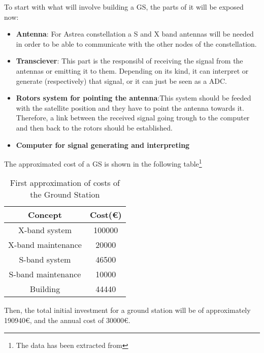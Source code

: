 To start with what will involve building a GS, the parts of it will be exposed now:

\begin{itemize}
\item \textbf{Antenna}: For Astrea constellation a S and X band antennas will be needed in order to be able to communicate with the other nodes of the constellation.
\item \textbf{Transciever}: This part is the responsibl of receiving the signal from the antennas or emitting it to them. Depending on its kind, it can interpret or generate (respectively) that signal, or it can just be seen as a ADC. \item \textbf{Rotors system for pointing the antenna}:This system should be feeded with the satellite position and they have to point the antenna towards it. Therefore, a link between the received signal going trough to the computer and then back to the rotors should be established. 
\item \textbf{Computer for signal generating and interpreting}
\end{itemize}

The approximated cost of a GS is shown in the following table\footnote{The data has been extracted from\cite{XBand}\cite{SBand} }

\begin{table}[H]
\begin{center}
\begin{tabular}{|c|c|}
\hline
\textbf{Concept}&\textbf{Cost(\euro)}\\
\hline
X-band system&100000\\
\hline
X-band maintenance&20000\\
\hline
S-band system&46500\\
\hline
S-band maintenance&10000\\
\hline
Building&44440\\
\hline
\end{tabular}
\caption[Aproximation of costs of a Ground Station]{First approximation of costs of the Ground Station}
\end{center}
\end{table}

Then, the total initial investment for a ground station will be of approximately 190940\euro, and the annual cost of 30000\euro.